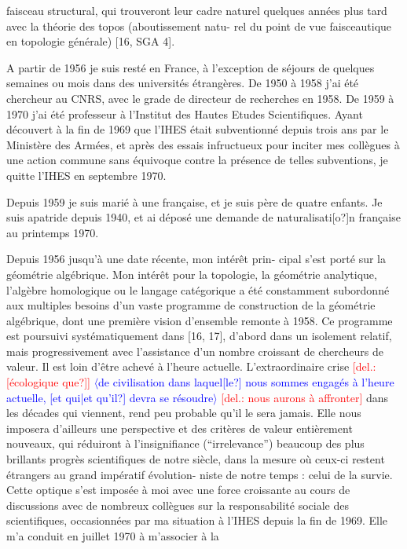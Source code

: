 \documentclass[11pt]{article}
\newcommand{\scanpage}[1]{\par\bigskip\noindent{\small\sffamily[scan #1]}\par}
\newcommand{\mspage}[1]{{\small\sffamily[p.\,#1]}}
\newcommand{\hand}[1]{\textcolor{blue}{#1}}
\newcommand{\inserted}[2][]{\textcolor{blue}{$\langle$#2$\rangle$}}
\newcommand{\deleted}[1]{\textcolor{red}{[\textsf{del.:} #1]}}
\newcommand{\unsure}[1]{[#1?]}
\begin{document}
\mspage{\hand{310}}

\clearpage
\scanpage{119/311}
\mspage{-2-}
faisceau  structural, qui trouveront leur cadre naturel quelques
années plus tard avec la théorie des topos (aboutissement natu-%
rel du point de vue faisceautique en topologie générale) [16,
SGA 4].

A partir de 1956 je suis resté en France, à l'exception
de séjours de quelques semaines ou mois dans des universités
étrangères. De 1950 à 1958 j'ai été chercheur au CNRS, avec le
grade de directeur de recherches en 1958. De 1959 à 1970 j'ai
été professeur à l'Institut des Hautes Etudes Scientifiques.
Ayant découvert à la fin de 1969 que l'IHES était subventionné
depuis trois ans par le Ministère des Armées, et après des essais
infructueux pour inciter mes collègues à une action commune sans
équivoque contre la présence de telles subventions, je quitte
l'IHES en septembre 1970.

Depuis 1959 je suis marié à une française, et je suis
père de quatre enfants. Je suis apatride depuis 1940, et ai
déposé une demande de naturalisati\unsure{o}n française au printemps 1970.

Depuis 1956 jusqu'à une date récente, mon intérêt prin-%
cipal s'est porté sur la géométrie algébrique. Mon intérêt pour
la topologie, la géométrie analytique, l'algèbre homologique ou
le langage catégorique a été constamment subordonné aux multiples
besoins d'un vaste programme de construction de la géométrie
algébrique, dont une première vision d'ensemble remonte à 1958.
Ce programme est poursuivi systématiquement dans [16, 17], d'abord
dans un isolement relatif, mais progressivement avec l'assistance
d'un nombre croissant de chercheurs de valeur. Il est loin d'être
achevé à l'heure actuelle. L'extraordinaire crise \deleted{\unsure{écologique que}} \inserted{de civilisation dans laquel\unsure{le} nous sommes engagés à l'heure actuelle, \unsure{et qui|et qu'il} devra se résoudre}
\deleted{nous aurons à affronter} dans les décades qui viennent, rend peu
probable qu'il le sera jamais. Elle nous imposera d'ailleurs
une perspective et des critères de valeur entièrement nouveaux,
qui réduiront à l'insignifiance (``irrelevance'') beaucoup des
plus brillants progrès scientifiques de notre siècle, dans la
mesure où ceux-ci restent étrangers au grand impératif évolution-%
niste de notre temps : celui de la survie. Cette optique s'est
imposée à moi avec une force croissante au cours de discussions
avec de nombreux collègues sur la responsabilité sociale des
scientifiques, occasionnées par ma situation à l'IHES depuis la
fin de 1969. Elle m'a conduit en juillet 1970 à m'associer à la
\end{document}
